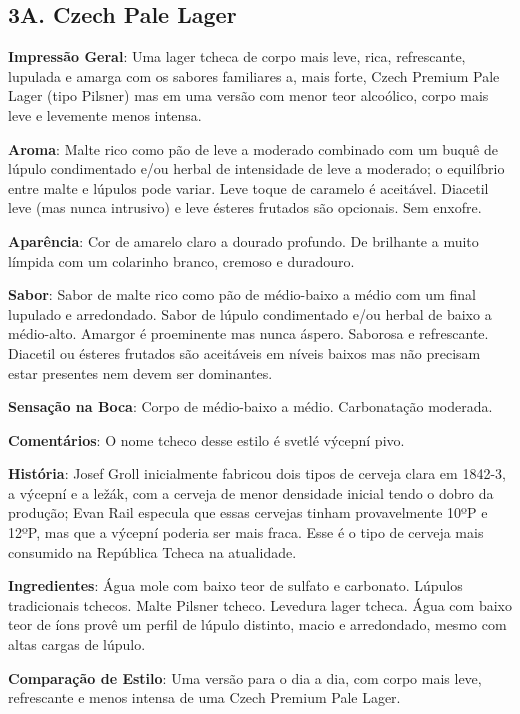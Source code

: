\subsection*{3A. Czech Pale Lager}
\textbf{Impressão Geral}: Uma lager tcheca de corpo mais leve, rica, refrescante, lupulada e amarga com os sabores familiares a, mais forte, Czech Premium Pale Lager (tipo Pilsner) mas em uma versão com menor teor alcoólico, corpo mais leve e levemente menos intensa.

\textbf{Aroma}: Malte rico como pão de leve a moderado combinado com um buquê de lúpulo condimentado e/ou herbal de intensidade de leve a moderado; o equilíbrio entre malte e lúpulos pode variar. Leve toque de caramelo é aceitável. Diacetil leve (mas nunca intrusivo) e leve ésteres frutados são opcionais. Sem enxofre.

\textbf{Aparência}: Cor de amarelo claro a dourado profundo. De brilhante a muito límpida com um colarinho branco, cremoso e duradouro.

\textbf{Sabor}: Sabor de malte rico como pão de médio-baixo a médio com um final lupulado e arredondado. Sabor de lúpulo condimentado e/ou herbal de baixo a médio-alto. Amargor é proeminente mas nunca áspero. Saborosa e refrescante. Diacetil ou ésteres frutados são aceitáveis em níveis baixos mas não precisam estar presentes nem devem ser dominantes.

\textbf{Sensação na Boca}: Corpo de médio-baixo a médio. Carbonatação moderada.

\textbf{Comentários}: O nome tcheco desse estilo é svetlé výcepní pivo.

\textbf{História}: Josef Groll inicialmente fabricou dois tipos de cerveja clara em 1842-3, a výcepní e a ležák, com a cerveja de menor densidade inicial tendo o dobro da produção; Evan Rail especula que essas cervejas tinham provavelmente 10ºP e 12ºP, mas que a výcepní poderia ser mais fraca. Esse é o tipo de cerveja mais consumido na República Tcheca na atualidade.

\textbf{Ingredientes}: Água mole com baixo teor de sulfato e carbonato. Lúpulos tradicionais tchecos. Malte Pilsner tcheco. Levedura lager tcheca. Água com baixo teor de íons provê um perfil de lúpulo distinto, macio e arredondado, mesmo com altas cargas de lúpulo.

\textbf{Comparação de Estilo}: Uma versão para o dia a dia, com corpo mais leve, refrescante e menos intensa de uma Czech Premium Pale Lager.

